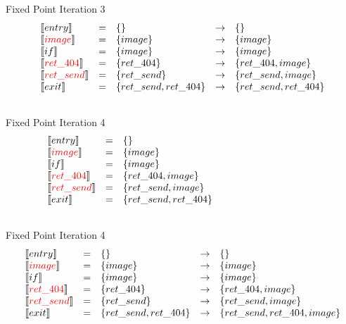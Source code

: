 \begin{frame}{Fixed Point Iteration 3}
\[
\begin{array}{lclcl}
  \constraint{entry} & = & \{\} & \rightarrow & \{\}\\
  \assignconstraint{image} & = & \{image\} & \rightarrow &\{image\}\\
  \constraint{if} & = & \{image\} & \rightarrow &\{image\}\\
  \assignconstraint{ret\_404} & = & \{ret\_404\} & \rightarrow &\{ret\_404, image\}\\
  \assignconstraint{ret\_send} & = & \{ret\_send\} & \rightarrow &\{ret\_send, image\}\\
  \constraint{exit} & = & \{ret\_send, ret\_404\} & \rightarrow & \{ret\_send, ret\_404\}\\
  && \phantom{\{command, param\}} && \phantom{\{command, param\}}
\end{array}
\]
\end{frame}


\begin{frame}{Fixed Point Iteration 4}
\[
\begin{array}{lclcl}
  \constraint{entry} & = & \{\} &&\\
  \assignconstraint{image} & = & \{image\} &&\\
  \constraint{if} & = & \{image\} &&\\
  \assignconstraint{ret\_404} & = & \{ret\_404, image\} &&\\
  \assignconstraint{ret\_send} & = & \{ret\_send, image\} &&\\
  \constraint{exit} & = & \{ret\_send, ret\_404\} &&\\
  && \phantom{\{command, param\}} && \phantom{\{command, param\}}
\end{array}
\]
\end{frame}

\begin{frame}{Fixed Point Iteration 4}
\[
\begin{array}{lclcl}
  \constraint{entry} & = & \{\} & \rightarrow & \{\}\\
  \assignconstraint{image} & = & \{image\} & \rightarrow &\{image\}\\
  \constraint{if} & = & \{image\} & \rightarrow &\{image\}\\
  \assignconstraint{ret\_404} & = & \{ret\_404\} & \rightarrow &\{ret\_404, image\}\\
  \assignconstraint{ret\_send} & = & \{ret\_send\} & \rightarrow &\{ret\_send, image\}\\
  \constraint{exit} & = & \{ret\_send, ret\_404\} & \rightarrow & \{ret\_send, ret\_404, image\}\\
  && \phantom{\{command, param\}} && \phantom{\{command, param\}}
\end{array}
\]
\end{frame}

